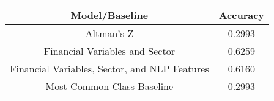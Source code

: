\footnotesize
\begin{tabular}{cc}
\toprule
Model/Baseline & Accuracy \\
\midrule
Altman's Z & 0.2993 \\
Financial Variables and Sector & 0.6259 \\
Financial Variables, Sector, and NLP Features & 0.6160 \\
Most Common Class Baseline & 0.2993 \\
\bottomrule
\end{tabular}

\normalsize